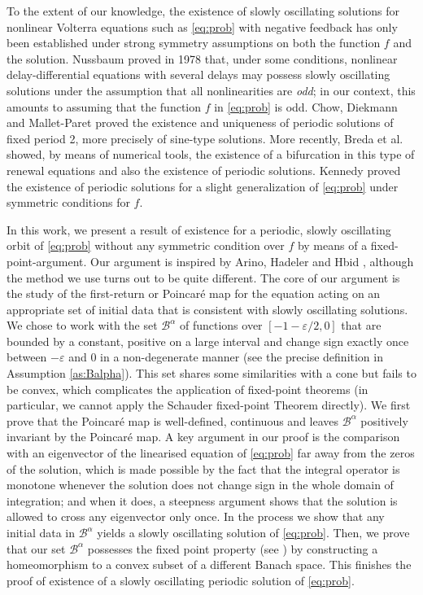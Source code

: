 \documentclass[a4paper,11pt]{article}
\theoremstyle{plain}
\theoremstyle{definition}
\theoremstyle{definition}
\numberwithin{equation}{section}
\begin{document}
To the extent of our knowledge, the existence of slowly oscillating solutions for nonlinear Volterra equations such as \eqref{eq:prob} with negative feedback has only been established under strong symmetry assumptions on both the function $f$ and the solution. 
Nussbaum \cite{Nussbaum-1978} proved in 1978 that, under some conditions, nonlinear delay-differential equations with several delays may possess slowly oscillating solutions under the assumption that all nonlinearities are \textit{odd}; in our context, this amounts to assuming that the function $f$ in \eqref{eq:prob} is odd.    
Chow, Diekmann and Mallet-Paret \cite{CDM}  proved the existence and uniqueness of periodic solutions of fixed period 2, more precisely of sine-type solutions. 
More recently, Breda et al. \cite{Diekmann} showed, by means of numerical tools, the existence of a bifurcation in this type of renewal equations and also the existence of periodic solutions. Kennedy \cite{Kennedy} proved the existence of periodic solutions for a slight generalization of \eqref{eq:prob} under symmetric conditions for $f$.




In this work, we present a result of existence for a periodic, slowly oscillating  orbit of \eqref{eq:prob} without any symmetric condition over $f$ by means of a fixed-point-argument. Our argument is inspired by Arino, Hadeler and Hbid \cite{Arino}, although the method we use turns out to be quite different. The core of our argument is the study of the first-return or Poincaré map for the equation acting on an appropriate set of initial data that is consistent with slowly oscillating solutions. 
We chose to work with the set $\mathcal{B}^\alpha$ of functions over $[-1-\varepsilon/2, 0]$ that are bounded by a constant,  positive on a large interval and change sign exactly once between $-\varepsilon$ and $0$ in a non-degenerate manner (see the precise definition in Assumption \ref{as:Balpha}). 
This set shares some similarities with a cone but fails to be convex, which complicates the application of fixed-point theorems (in particular, we cannot apply the Schauder fixed-point Theorem directly).
We first prove that the Poincaré map is well-defined, continuous and leaves $\mathcal{B}^\alpha$ positively invariant by the Poincaré map. A key argument in our proof is the comparison with an eigenvector of the linearised equation of \eqref{eq:prob} far away from the zeros of the solution, which is made possible by the fact that the integral operator is monotone whenever the solution does not change sign in the whole domain of integration; and  when it does, a steepness argument shows that the solution is allowed to cross any eigenvector only once. 
In the process we show that  any initial data in $\mathcal{B}^\alpha$ yields a slowly oscillating solution of \eqref{eq:prob}. 
Then, we prove that our set $\mathcal{B}^\alpha$ possesses the fixed point property (see \cite{GD}) by constructing a homeomorphism to a convex subset of a different Banach space. This finishes the proof of existence of a slowly oscillating periodic solution of \eqref{eq:prob}.
\medskip
\end{document}
